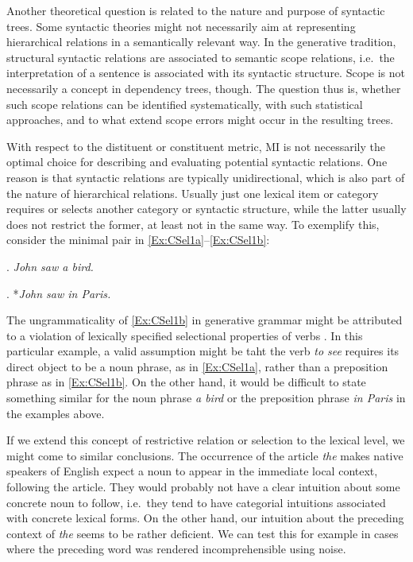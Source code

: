 \documentclass[11pt,a4paper,english]{article}
\begin{document}
Another theoretical question is related to the nature and purpose of syntactic trees. Some syntactic theories might not necessarily aim at representing hierarchical relations in a semantically relevant way. In the generative tradition, structural syntactic relations are associated to semantic scope relations, i.e.\ the interpretation of a sentence is associated with its syntactic structure. Scope is not necessarily a concept in dependency trees, though. The question thus is, whether such scope relations can be identified systematically, with such statistical approaches, and to what extend scope errors might occur in the resulting trees.

With respect to the distituent or constituent metric, MI is not necessarily the optimal choice for describing and evaluating potential syntactic relations. One reason is that syntactic relations are typically unidirectional, which is also part of the nature of hierarchical relations. Usually just one lexical item or category requires or selects another category or syntactic structure, while the latter usually does not restrict the former, at least not in the same way. To exemplify this, consider the minimal pair in \ref{Ex:CSel1a}--\ref{Ex:CSel1b}:

\ex. \textit{John saw a bird.}\label{Ex:CSel1a}

\ex. *\textit{John saw in Paris.}\label{Ex:CSel1b}

The ungrammaticality of \ref{Ex:CSel1b} in generative grammar might be attributed to a violation of lexically specified selectional properties of verbs \citep[e.g.][]{Chomsky:1965}. In this particular example, a valid assumption might be taht the verb \textit{to see} requires its direct object to be a noun phrase, as in \ref{Ex:CSel1a}, rather than a preposition phrase as in \ref{Ex:CSel1b}. On the other hand, it would be difficult to state something similar for the noun phrase \textit{a bird} or the preposition phrase \textit{in Paris} in the examples above.

If we extend this concept of restrictive relation or selection to the lexical level, we might come to similar conclusions. The occurrence of the article \textit{the} makes native speakers of English expect a noun to appear in the immediate local context, following the article. They would probably not have a clear intuition about some concrete noun to follow, i.e.\ they tend to have categorial intuitions associated with concrete lexical forms. On the other hand, our intuition about the preceding context of \textit{the} seems to be rather deficient. We can test this for example in cases where the preceding word was rendered incomprehensible using noise.
\end{document}
